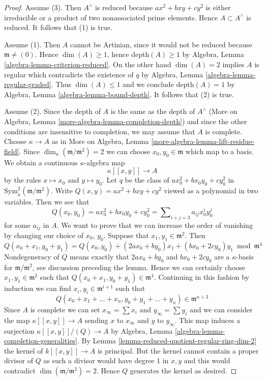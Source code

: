 \documentclass{stacks-project}
\theoremstyle{plain}
\theoremstyle{definition}
\theoremstyle{remark}
\numberwithin{equation}{subsection}
\begin{document}
\begin{proof}
Assume (3). Then $A^\wedge$ is reduced because $ax^2 + bxy + cy^2$
is either irreducible or a product of two nonassociated prime elements.
Hence $A \subset A^\wedge$ is reduced. It follows that (1) is true.

\medskip\noindent
Assume (1). Then $A$ cannot be Artinian, since it would not be reduced
because $\mathfrak m \not = (0)$.
Hence $\dim(A) \geq 1$, hence $\text{depth}(A) \geq 1$
by Algebra, Lemma \ref{algebra-lemma-criterion-reduced}.
On the other hand $\dim(A) = 2$ implies $A$ is regular
which contradicts the existence of $q$ by
Algebra, Lemma \ref{algebra-lemma-regular-graded}.
Thus $\dim(A) \leq 1$ and we conclude $\text{depth}(A) = 1$
by Algebra, Lemma \ref{algebra-lemma-bound-depth}.
It follows that (2) is true.

\medskip\noindent
Assume (2). Since the depth of $A$ is the same as the depth of $A^\wedge$
(More on Algebra, Lemma \ref{more-algebra-lemma-completion-depth})
and since the other conditions are insensitive to completion, we may
assume that $A$ is complete. Choose $\kappa \to A$ as in
More on Algebra, Lemma \ref{more-algebra-lemma-lift-residue-field}.
Since $\dim_\kappa(\mathfrak m/\mathfrak m^2) = 2$ we can choose
$x_0, y_0 \in \mathfrak m$ which map to a basis.
We obtain a continuous $\kappa$-algebra map
$$
\kappa[[x, y]] \longrightarrow A
$$
by the rules $x \mapsto x_0$ and $y \mapsto y_0$. Let
$q$ be the class of $ax_0^2 + bx_0y_0 + cy_0^2$ in
$\text{Sym}^2_\kappa(\mathfrak m/\mathfrak m^2)$.
Write $Q(x, y) = ax^2 + bxy + cy^2$ viewed as a polynomial
in two variables. Then we see that
$$
Q(x_0, y_0) = ax_0^2 + bx_0y_0 + cy_0^2 =
\sum\nolimits_{i + j = 3} a_{ij} x_0^iy_0^j
$$
for some $a_{ij}$ in $A$. We want to prove that we can
increase the order of vanishing by changing our choice
of $x_0$, $y_0$. Suppose that $x_1, y_1 \in \mathfrak m^2$.
Then
$$
Q(x_0 + x_1, y_0 + y_1) = Q(x_0, y_0) +
(2ax_0 + by_0)x_1 + (bx_0 + 2cy_0)y_1 \bmod \mathfrak m^4
$$
Nondegeneracy of $Q$ means exactly that $2ax_0 + by_0$ and $bx_0 + 2cy_0$
are a $\kappa$-basis for $\mathfrak m/\mathfrak m^2$, see discussion
preceding the lemma. Hence we can
certainly choose $x_1, y_1 \in \mathfrak m^2$ such that
$Q(x_0 + x_1, y_0 + y_1) \in \mathfrak m^4$.
Continuing in this fashion by induction
we can find $x_i, y_i \in \mathfrak m^{i + 1}$
such that
$$
Q(x_0 + x_1 + \ldots + x_n, y_0 + y_1 + \ldots + y_n) \in \mathfrak m^{n + 3}
$$
Since $A$ is complete we can set
$x_\infty = \sum x_i$ and $y_\infty = \sum y_i$
and we can consider the map $\kappa[[x, y]] \longrightarrow A$
sending $x$ to $x_\infty$ and $y$ to $y_\infty$. This map
induces a surjection $\kappa[[x, y]]/(Q) \longrightarrow A$ by
Algebra, Lemma \ref{algebra-lemma-completion-generalities}.
By Lemma \ref{lemma-reduced-quotient-regular-ring-dim-2}
the kernel of $k[[x, y]] \to A$ is principal.
But the kernel cannot contain a proper divisor of $Q$
as such a divisor would have degree $1$ in $x, y$
and this would contradict $\dim(\mathfrak m/\mathfrak m^2) = 2$.
Hence $Q$ generates the kernel as desired.
\end{proof}
\end{document}
